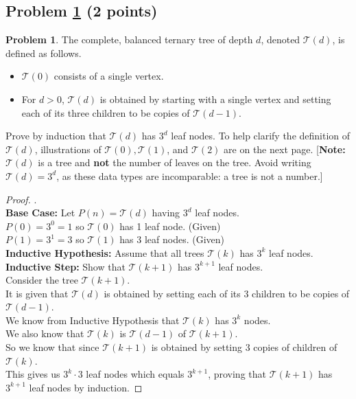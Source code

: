 \documentclass[11pt]{article}
\theoremstyle{definition}
\theoremstyle{definition}
\newtheorem{required}{Problem}
\theoremstyle{definition}
\begin{document}
\newpage
\subsection{Problem \ref{Induction3} (2 points)}
\begin{required} \label{Induction3}
The complete, balanced ternary tree of depth $d$, denoted $\mathcal{T}(d)$, is defined as follows. 
\begin{itemize}
\item $\mathcal{T}(0)$ consists of a single vertex.
\item For $d > 0$, $\mathcal{T}(d)$ is obtained by starting with a single vertex and setting each of its three children to be copies of $\mathcal{T}(d-1)$.
\end{itemize}

\noindent Prove by induction that $\mathcal{T}(d)$ has $3^{d}$ leaf nodes. To help clarify the definition of $\mathcal{T}(d)$, illustrations of $\mathcal{T}(0), \mathcal{T}(1)$, and $\mathcal{T}(2)$ are on the next page. [\textbf{Note:} $\mathcal{T}(d)$ is a tree and \textbf{not} the number of leaves on the tree. Avoid writing $\mathcal{T}(d) = 3^{d}$, as these data types are incomparable: a tree is not a number.]
\end{required}

\begin{proof}.\\
\indent \textbf{Base Case:}
Let $P(n) = \mathcal{T}(d)$ having $3^{d}$ leaf nodes.\\
\indent $P(0) = 3^0 = 1$ so $\mathcal{T}(0)$ has 1 leaf node. (Given)\\
\indent $P(1) = 3^1 = 3$ so $\mathcal{T}(1)$ has 3 leaf nodes. (Given)\\

\textbf{Inductive Hypothesis:} Assume that all trees $\mathcal{T}(k)$ has $3^k$ leaf nodes.\\

\textbf{Inductive Step:} Show that $\mathcal{T}(k + 1)$ has $3^{k+1}$ leaf nodes.\\
\indent Consider the tree $\mathcal{T}(k + 1)$.\\ 
\indent It is given that $\mathcal{T}(d)$ is obtained by setting each of its 3 children to be copies of $\mathcal{T}(d-1)$.\\
\indent We know from Inductive Hypothesis that $\mathcal{T}(k)$ has $3^k$ nodes.\\
\indent We also know that $\mathcal{T}(k)$ is $\mathcal{T}(d-1)$ of $\mathcal{T}(k+1)$.\\
\indent So we know that since $\mathcal{T}(k+1)$ is obtained by setting 3 copies of children of $\mathcal{T}(k)$.\\
\indent This gives us $3^k \cdot 3$ leaf nodes which equals $3^{k+1}$, proving that $\mathcal{T}(k+1)$ has $3^{k+1}$ leaf nodes by induction.

\end{proof}
\end{document}
